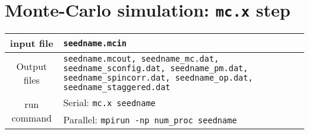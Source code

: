 \documentclass[10pt]{report}
\begin{document}
\chapter{Monte-Carlo simulation: {\tt mc.x} step}
\begin{center}
\begin{tabular}{|c|p{10cm}|}
\toprule
\hline
input file   & {\tt seedname.mcin}\\
\hline
Output files & {\tt seedname.mcout, seedname\_mc.dat, seedname\_sconfig.dat, seedname\_pm.dat,
 seedname\_spincorr.dat, seedname\_op.dat, seedname\_staggered.dat }\\
\hline
\multirow{2}{5cm}{run command}  & Serial: {\tt mc.x seedname}\\
&Parallel: {\tt mpirun -np num\_proc seedname}\\
\hline
\bottomrule
\end{tabular}
\end{center}
\end{document}
